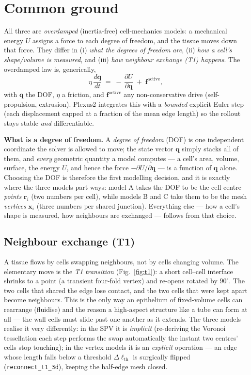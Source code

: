 \documentclass[11pt]{article}
\begin{document}
\section{Common ground}
All three are \emph{overdamped} (inertia-free) cell-mechanics models: a mechanical energy $U$ assigns a
force to each degree of freedom, and the tissue moves down that force. They differ in (i) \emph{what the
degrees of freedom are}, (ii) \emph{how a cell's shape/volume is measured}, and (iii) \emph{how neighbour
exchange (T1) happens}. The overdamped law is, generically,
\begin{equation}
\eta\,\frac{d\mathbf{q}}{dt} \;=\; -\,\frac{\partial U}{\partial \mathbf{q}} \;+\; \mathbf{f}^{\text{active}},
\label{eq:overdamped}
\end{equation}
with $\mathbf{q}$ the DOF, $\eta$ a friction, and $\mathbf{f}^{\text{active}}$ any non-conservative drive
(self-propulsion, extrusion). Plexus2 integrates this with a \emph{bounded} explicit Euler step (each
displacement capped at a fraction of the mean edge length) so the rollout stays stable \emph{and}
differentiable.

\textbf{What is a degree of freedom.} A \emph{degree of freedom} (DOF) is one independent coordinate the
solver is allowed to move; the state vector $\mathbf{q}$ simply stacks all of them, and \emph{every} geometric
quantity a model computes --- a cell's area, volume, surface, the energy $U$, and hence the force
$-\partial U/\partial\mathbf q$ --- is a function of $\mathbf q$ alone. Choosing the DOF is therefore the first
modelling decision, and it is exactly where the three models part ways: model A takes the DOF to be the
cell-centre \emph{points} $\mathbf r_i$ (two numbers per cell), while models B and C take them to be the mesh
\emph{vertices} $\mathbf x_i$ (three numbers per shared junction). Everything else --- how a cell's shape is
measured, how neighbours are exchanged --- follows from that choice.

\subsection*{Neighbour exchange (T1)}
A tissue flows by cells swapping neighbours, not by cells changing volume. The elementary move is the
\emph{T1 transition} (Fig.~\ref{fig:t1}): a short cell--cell interface shrinks to a point (a transient
four-fold vertex) and re-opens rotated by $90^\circ$. The two cells that shared the edge lose contact, and
the two cells that were kept apart become neighbours. This is the only way an epithelium of fixed-volume
cells can rearrange (fluidise) and the reason a high-aspect structure like a tube can form at all --- the wall
cells must slide past one another as it extends. The three models realise it very differently: in the SPV it
is \emph{implicit} (re-deriving the Voronoi tessellation each step performs the swap automatically the instant
two centres' cells stop touching); in the vertex models it is an \emph{explicit} operation --- an edge whose
length falls below a threshold $\Delta\ell_{\text{th}}$ is surgically flipped (\texttt{reconnect\_t1\_3d}),
keeping the half-edge mesh closed.
\end{document}
